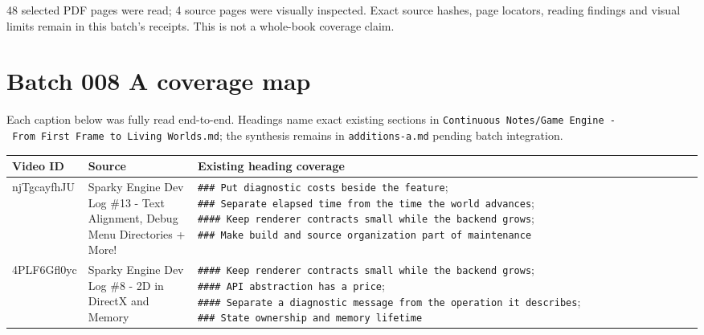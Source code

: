 48 selected PDF pages were read; 4 source pages were visually inspected. Exact source hashes, page locators, reading findings and visual limits remain in this batch's receipts. This is not a whole-book coverage claim.

\chapter{Batch 008 A coverage map}\label{appendix-877738f6f4d2-batch-008-a-coverage-map}

Each caption below was fully read end-to-end. Headings name exact existing sections in \texttt{Continuous\ Notes/Game\ Engine\ -\ From\ First\ Frame\ to\ Living\ Worlds.md}; the synthesis remains in \texttt{additions-a.md} pending batch integration.

{\def\LTcaptype{none} %
\begin{longtable}[]{@{}
  >{\raggedright\arraybackslash}p{}
  >{\raggedright\arraybackslash}p{}
  >{\raggedright\arraybackslash}p{}@{}}
\toprule\noalign{}
\begin{minipage}[b]{\linewidth}\raggedright
Video ID
\end{minipage} & \begin{minipage}[b]{\linewidth}\raggedright
Source
\end{minipage} & \begin{minipage}[b]{\linewidth}\raggedright
Existing heading coverage
\end{minipage} \\
\midrule\noalign{}
\endhead
\bottomrule\noalign{}
\endlastfoot
njTgcayfhJU & Sparky Engine Dev Log \#13 - Text Alignment, Debug Menu Directories + More! & \texttt{\#\#\#\ Put\ diagnostic\ costs\ beside\ the\ feature}; \texttt{\#\#\#\ Separate\ elapsed\ time\ from\ the\ time\ the\ world\ advances}; \texttt{\#\#\#\#\ Keep\ renderer\ contracts\ small\ while\ the\ backend\ grows}; \texttt{\#\#\#\ Make\ build\ and\ source\ organization\ part\ of\ maintenance} \\
4PLF6Gfl0yc & Sparky Engine Dev Log \#8 - 2D in DirectX and Memory & \texttt{\#\#\#\#\ Keep\ renderer\ contracts\ small\ while\ the\ backend\ grows}; \texttt{\#\#\#\#\ API\ abstraction\ has\ a\ price}; \texttt{\#\#\#\#\ Separate\ a\ diagnostic\ message\ from\ the\ operation\ it\ describes}; \texttt{\#\#\#\ State\ ownership\ and\ memory\ lifetime} \\

\end{longtable}}

